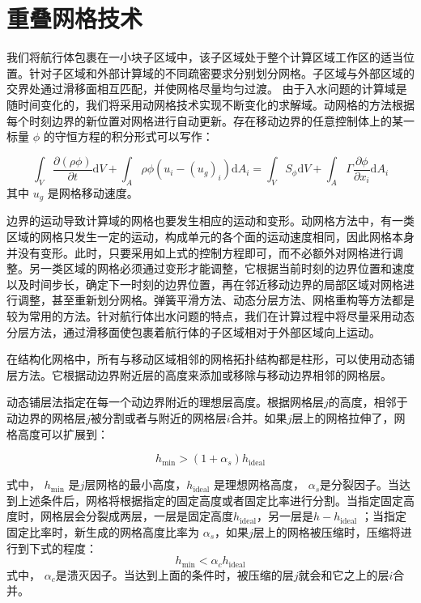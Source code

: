 \section{重叠网格技术}


我们将航行体包裹在一小块子区域中，该子区域处于整个计算区域工作区的适当位置。针对子区域和外部计算域的不同疏密要求分别划分网格。子区域与外部区域的交界处通过滑移面相互匹配，并使网格尽量均匀过渡。
由于入水问题的计算域是随时间变化的，我们将采用动网格技术实现不断变化的求解域。动网格的方法根据每个时刻边界的新位置对网格进行自动更新。存在移动边界的任意控制体上的某一标量 $\phi$ 的守恒方程的积分形式可以写作：

\begin{equation}
  \int _V \frac {\partial (\rho \phi)} {\partial t} \mathrm dV + \int_A \rho \phi (u_i - (u_g)_i) \mathrm d A_i = \int_V S_\phi \mathrm dV + \int _A \Gamma \frac {\partial \phi}{\partial x_i} \mathrm d A_i
\end{equation}
其中 $u_g$ 是网格移动速度。

边界的运动导致计算域的网格也要发生相应的运动和变形。动网格方法中，有一类区域的网格只发生一定的运动，构成单元的各个面的运动速度相同，因此网格本身并没有变形。此时，只要采用如上式的控制方程即可，而不必额外对网格进行调整。另一类区域的网格必须通过变形才能调整，它根据当前时刻的边界位置和速度以及时间步长，确定下一时刻的边界位置，再在邻近移动边界的局部区域对网格进行调整，甚至重新划分网格。弹簧平滑方法、动态分层方法、网格重构等方法都是较为常用的方法。针对航行体出水问题的特点，我们在计算过程中将尽量采用动态分层方法，通过滑移面使包裹着航行体的子区域相对于外部区域向上运动。

在结构化网格中，所有与移动区域相邻的网格拓扑结构都是柱形，可以使用动态铺层方法。它根据动边界附近层的高度来添加或移除与移动边界相邻的网格层。

动态铺层法指定在每一个动边界附近的理想层高度。根据网格层$j$的高度，相邻于动边界的网格层$j$被分割或者与附近的网格层$i$合并。如果$j$层上的网格拉伸了，网格高度可以扩展到：

\begin{equation}
  h_{\min} > (1 + \alpha _s) h_{\mathrm{ideal}}
\end{equation}

式中， $h_{\min}$ 是$j$层网格的最小高度，$h_{\mathrm{ideal}}$ 是理想网格高度， $\alpha _s$是分裂因子。当达到上述条件后，网格将根据指定的固定高度或者固定比率进行分割。当指定固定高度时，网格层会分裂成两层，一层是固定高度$h_{\mathrm{ideal}}$，另一层是$h - h_{\mathrm{ideal}}$ ；当指定固定比率时，新生成的网格高度比率为 $\alpha_s$，如果$j$层上的网格被压缩时，压缩将进行到下式的程度：
\begin{equation}
  h_{\min} < \alpha _c h_{\mathrm {ideal}}
\end{equation}
式中， $\alpha _c$是溃灭因子。当达到上面的条件时，被压缩的层$j$就会和它之上的层$i$合并。

